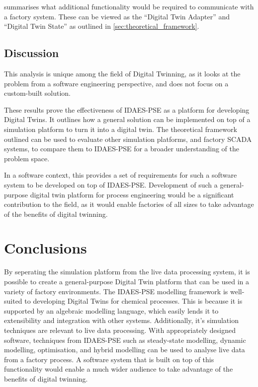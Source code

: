 \documentclass[12pt]{article}
\begin{document}
 summarises what additional functionality would be required to communicate with a factory system. These can be viewed as the ``Digital Twin Adapter'' and ``Digital Twin State'' as outlined in \cref{sec:theoretical_framework}.


\subsection{Discussion}

This analysis is unique among the field of Digital Twinning, as it looks at the problem from a software engineering perspective, and does not focus on a custom-built solution.

These results prove the effectiveness of IDAES-PSE as a platform for developing Digital Twins. It outlines how a general solution can be implemented on top of a simulation platform to turn it into a digital twin. The theoretical framework outlined can be used to evaluate other simulation platforms, and factory SCADA systems, to compare them to IDAES-PSE for a broader understanding of the problem space.

In a software context, this provides a set of requirements for such a software system to be developed on top of IDAES-PSE.
Development of such a general-purpose digital twin platform for process engineering would be a significant contribution to the field, as it would enable factories of all sizes to take advantage of the benefits of digital twinning.


\section{Conclusions}

By seperating the simulation platform from the live data processing system, it is possible to create a general-purpose Digital Twin platform that can be used in a variety of factory environments.
The IDAES-PSE modelling framework is well-suited to developing Digital Twins for chemical processes. 
This is because it is supported by an algebraic modelling language, which easily lends it to extensibility and integration with other systems. Additionally, it's simulation techniques are relevant to live data processing.
With appropriately designed software, techniques from IDAES-PSE such as steady-state modelling, dynamic modelling, optimisation, and hybrid modelling can be used to analyse live data from a factory process. 
A software system that is built on top of this functionality would enable a much wider audience to take advantage of the benefits of digital twinning. 
\end{document}
